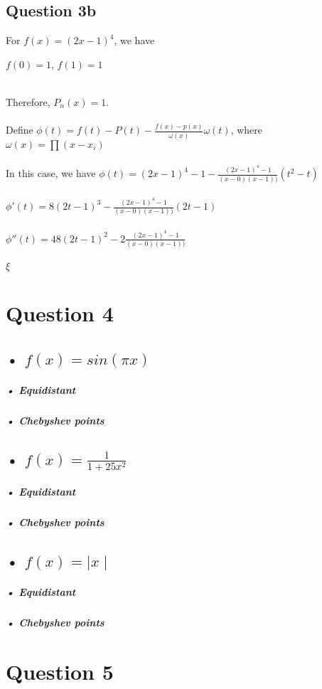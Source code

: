 \documentclass[11pt]{article} %
\begin{document}
\subsection{Question 3b}
For $f(x) = (2x-1)^{4}$, we have\\
\centerline{$f(0)=1$, $f(1)=1$}\\
Therefore, $P_{n}(x)=1$.\\\\
Define $\phi(t) = f(t)-P(t)-\frac{f(x)-p(x)}{\omega(x)}\omega(t)$, where $\omega(x) = \prod(x-x_{i})$\\\\
In this case, we have $\phi(t) = (2x-1)^{4}-1-\frac{(2x-1)^{4}-1}{(x-0)(x-1))}(t^{2}-t)$\\\\
$\phi'(t) = 8(2t-1)^{3}-\frac{(2x-1)^{4}-1}{(x-0)(x-1))}(2t-1)$\\\\
$\phi''(t) = 48(2t-1)^{2}-2\frac{(2x-1)^{4}-1}{(x-0)(x-1))}$\\\\
$\xi$

\section{Question 4}
\subsection{• $f(x)=sin(\pi x)$}
\subparagraph{• Equidistant}
\subparagraph{• Chebyshev points}
\subsection{• $f(x)=\frac{1}{1+25x^{2}}$}
\subparagraph{• Equidistant}
\subparagraph{• Chebyshev points}
\subsection{• $f(x)=\mid x\mid$}
\subparagraph{• Equidistant}
\subparagraph{• Chebyshev points}
\section{Question 5}
\end{document}
